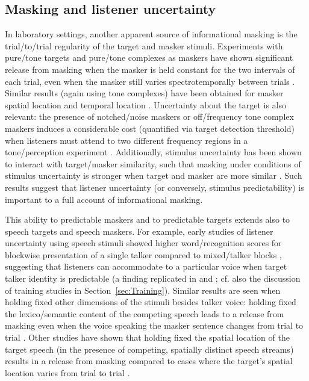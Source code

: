 \subsection{Masking and listener uncertainty\label{sec:uncertainty}}
In laboratory settings, another apparent source of informational masking is the trial\-/to\-/trial regularity of the target and masker stimuli.  Experiments with pure\-/tone targets and pure\-/tone complexes as maskers have shown significant release from masking when the masker is held constant for the two intervals of each trial, even when the masker still varies spectrotemporally between trials \citep{NeffGreen1987, NeffCallahan1988}.  Similar results (again using tone complexes) have been obtained for masker spatial location \citep{FanEtAl2008} and temporal location \citep{BoninoLeibold2008}.  Uncertainty about the target is also relevant: the presence of notched\-/noise maskers or off\-/frequency tone complex maskers induces a considerable cost (quantified via target detection threshold) when listeners must attend to two different frequency regions in a tone\-/perception experiment \citep{KiddEtAl2008}.  Additionally, stimulus uncertainty has been shown to interact with target\-/masker similarity, such that masking under conditions of stimulus uncertainty is stronger when target and masker are more similar \citep{DurlachEtAl2003b}.  Such results suggest that listener uncertainty (or conversely, stimulus predictability) is important to a full account of informational masking.

This ability to  predictable maskers and  to predictable targets extends also to speech targets and speech maskers.  For example, early studies of listener uncertainty using speech stimuli showed higher word\-/recognition scores for blockwise presentation of a single talker compared to mixed\-/talker blocks \citep{SommersEtAl1994}, suggesting that listeners can accommodate to a particular voice when target talker identity is predictable (a finding replicated in \citealt{BrungartSimpson2004} and \citealt{EricsonEtAl2004}; cf. also the discussion of training studies in Section~\ref{sec:Training}).  Similar results are seen when holding fixed other dimensions of the stimuli besides talker voice: holding fixed the lexico\-/semantic content of the competing speech leads to a release from masking even when the voice speaking the masker sentence changes from trial to trial \citep{BrungartSimpson2004}.  Other studies have shown that holding fixed the spatial location of the target speech (in the presence of competing, spatially distinct speech streams) results in a release from masking compared to cases where the target’s spatial location varies from trial to trial \citep{EricsonEtAl2004, KiddEtAl2005a}.  

